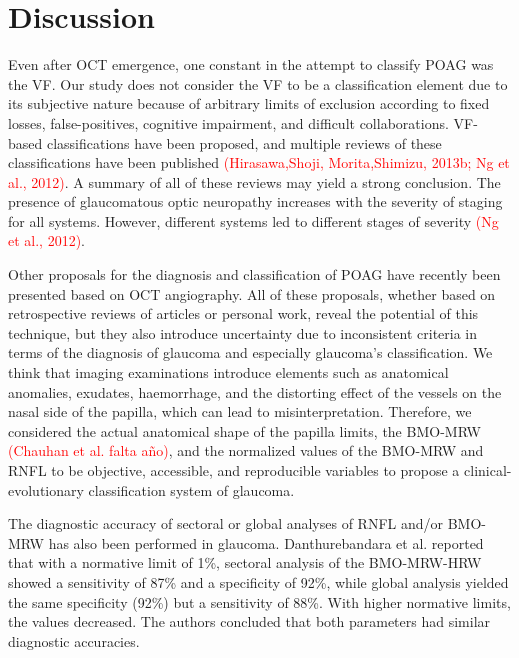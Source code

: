 \documentclass[fleqn,10pt]{wlscirep}
\begin{document}
\section*{Discussion}

Even after OCT emergence, one constant in the attempt to classify POAG was the VF. Our study does not consider the VF to be a classification element due to its subjective nature because of arbitrary limits of exclusion according to fixed losses, false-positives, cognitive impairment, and difficult collaborations. VF-based classifications have been proposed, and multiple reviews of these classifications have been published \cite{germano:2017:evaluation, hirasawa:2013:} \textcolor{red}{(Hirasawa,Shoji, Morita,Shimizu, 2013b; Ng et al., 2012)}. A summary of all of these reviews may yield a strong conclusion. The presence of glaucomatous optic neuropathy increases with the severity of staging for all systems. However, different systems led to different stages of severity \textcolor{red}{(Ng  et al., 2012)}.

Other proposals for the diagnosis and classification of POAG have recently been presented based on OCT angiography\cite{mansoori:2018:optical,miguel:2019:diagnostic,rabiolo:2018:comparison,hollo:2018:optical,saba:2018:fundus}. All of these proposals, whether based on retrospective reviews of articles\cite{saba:2018:fundus} or personal work, reveal the potential of this technique, but they also introduce uncertainty due to inconsistent criteria in terms of the diagnosis of glaucoma and especially glaucoma’s classification. We think that imaging examinations introduce elements such as anatomical anomalies, exudates, haemorrhage, and the distorting effect of the vessels on the nasal side of the papilla, which can lead to misinterpretation. Therefore, we considered the actual anatomical shape of the papilla limits, the BMO-MRW \textcolor{red}{(Chauhan et al. falta año)}, and the normalized values of the BMO-MRW and RNFL to be objective, accessible, and reproducible variables to propose a clinical-evolutionary classification system of glaucoma.

The diagnostic accuracy of sectoral or global analyses of RNFL and/or BMO-MRW has also been performed in glaucoma. Danthurebandara et al. \cite{danthurebandara:2016:diagnostic} reported that with a normative limit of 1\%, sectoral analysis of the BMO-MRW-HRW showed a sensitivity of 87\% and a specificity of 92\%, while global analysis yielded the same specificity (92\%) but a sensitivity of 88\%. With higher normative limits, the values decreased. The authors concluded that both parameters had similar diagnostic accuracies.
\end{document}

